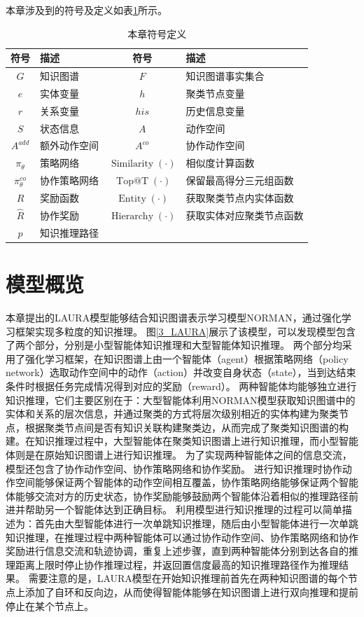 \documentclass[algorithmlist, AutoFakeBold, AutoFakeSlant, figurelist, tablelist, nomlist, engineering]{seuthesix}
\begin{document}
本章涉及到的符号及定义如表\ref{3_symbols}所示。
\begin{table}[ht]
  \centering
  \caption{本章符号定义}
  \begin{tabular*}{0.8\textwidth}{@{\extracolsep{\fill}}clcl}
		\toprule[1pt]
    符号 & 描述 & 符号 & 描述\\ \hline
    $G$ & 知识图谱 & $F$ & 知识图谱事实集合\\
    $e$ & 实体变量 & $h$ & 聚类节点变量\\
    $r$ & 关系变量 & $his$ & 历史信息变量\\
    $S$ & 状态信息 & $A$ & 动作空间\\
    $A^{add}$ & 额外动作空间 & $A^{co}$ & 协作动作空间\\
    $\pi_\theta$ & 策略网络 & $\operatorname{Similarity}(\cdot)$ & 相似度计算函数\\
    $\pi_\theta^{co}$ & 协作策略网络 & $\operatorname{Top@T}(\cdot)$ & 保留最高得分三元组函数\\
    $R$ & 奖励函数 & $\operatorname{Entity}(\cdot)$ & 获取聚类节点内实体函数\\
    $\hat{R}$ & 协作奖励 & $\operatorname{Hierarchy}(\cdot)$ & 获取实体对应聚类节点函数\\
    $p$ & 知识推理路径 & &\\
		\bottomrule[1pt]
	\end{tabular*}
  \label{3_symbols}
\end{table}

\section{模型概览}
本章提出的LAURA模型能够结合知识图谱表示学习模型NORMAN，通过强化学习框架实现多粒度的知识推理。
图\ref{3_LAURA}展示了该模型，可以发现模型包含了两个部分，分别是小型智能体知识推理和大型智能体知识推理。
两个部分均采用了强化学习框架，在知识图谱上由一个智能体（agent）根据策略网络（policy network）选取动作空间中的动作（action）并改变自身状态（state），当到达结束条件时根据任务完成情况得到对应的奖励（reward）。
两种智能体均能够独立进行知识推理，它们主要区别在于：大型智能体利用NORMAN模型获取知识图谱中的实体和关系的层次信息，并通过聚类的方式将层次级别相近的实体构建为聚类节点，根据聚类节点间是否有知识关联构建聚类边，从而完成了聚类知识图谱的构建。在知识推理过程中，大型智能体在聚类知识图谱上进行知识推理，而小型智能体则是在原始知识图谱上进行知识推理。
为了实现两种智能体之间的信息交流，模型还包含了协作动作空间、协作策略网络和协作奖励。
进行知识推理时协作动作空间能够保证两个智能体的动作空间相互覆盖，协作策略网络能够保证两个智能体能够交流对方的历史状态，协作奖励能够鼓励两个智能体沿着相似的推理路径前进并帮助另一个智能体达到正确目标。
利用模型进行知识推理的过程可以简单描述为：首先由大型智能体进行一次单跳知识推理，随后由小型智能体进行一次单跳知识推理，在推理过程中两种智能体可以通过协作动作空间、协作策略网络和协作奖励进行信息交流和轨迹协调，重复上述步骤，直到两种智能体分别到达各自的推理距离上限时停止协作推理过程，并返回置信度最高的知识推理路径作为推理结果。
需要注意的是，LAURA模型在开始知识推理前首先在两种知识图谱的每个节点上添加了自环和反向边，从而使得智能体能够在知识图谱上进行双向推理和提前停止在某个节点上。
\end{document}
